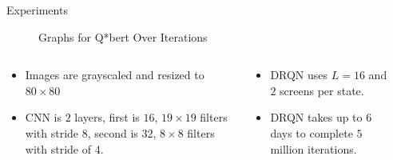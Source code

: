 \documentclass[final]{beamer}
\newlength{\sepwid}
\newlength{\onecolwid}
\newlength{\twocolwid}
\begin{document}
\begin{frame}[t]
\begin{columns}[t]
\begin{column}{\twocolwid}
\begin{column}{\twocolwid}
\begin{block}{Experiments}
\begin{figure}[h]
\begin{minipage}{1.0\textwidth}
    \end{minipage}
    \caption{Graphs for Q*bert Over Iterations}
\end{figure}
\end{block}
\end{column}

\begin{columns}[t,totalwidth=\twocolwid] %

\begin{column}{\onecolwid} %

\begin{itemize}
    \item Images are grayscaled and resized to $80 \times 80$
    \item CNN is $2$ layers, first is $16$, $19 \times 19$ filters with stride
        $8$, second is $32$, $8 \times 8$ filters with stride of $4$.
\end{itemize}

\end{column} %


\begin{column}{\onecolwid} %
\begin{itemize}
    \item DRQN uses $L=16$ and $2$ screens per state.
    \item DRQN takes up to $6$ days to complete $5$ million iterations.
\end{itemize}


\end{column} %

\end{columns} %


\end{column} %

\begin{column}{\sepwid}\end{column} %


\end{columns}
\end{frame}
\end{document}
